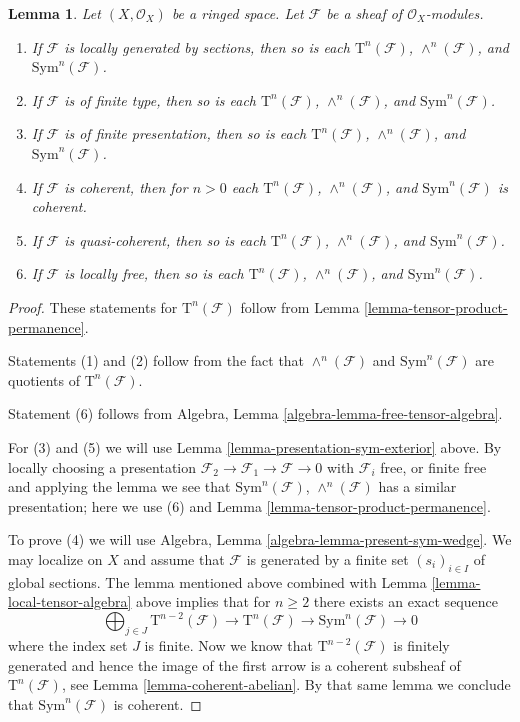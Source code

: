 \documentclass[10pt,a4paper]{amsart}
\theoremstyle{plain}
\newtheorem{lemma}[subsection]{Lemma}
\theoremstyle{definition}
\theoremstyle{remark}
\numberwithin{equation}{subsection}
\begin{document}
\begin{lemma}
\label{lemma-tensor-algebra-permanence}
Let $(X, \mathcal{O}_X)$ be a ringed space.
Let $\mathcal{F}$ be a sheaf of $\mathcal{O}_X$-modules.
\begin{enumerate}
\item If $\mathcal{F}$ is locally generated by sections,
then so is each $\text{T}^n(\mathcal{F})$,
$\wedge^n(\mathcal{F})$, and $\text{Sym}^n(\mathcal{F})$.
\item If $\mathcal{F}$ is of finite type,
then so is each $\text{T}^n(\mathcal{F})$,
$\wedge^n(\mathcal{F})$, and $\text{Sym}^n(\mathcal{F})$.
\item If $\mathcal{F}$ is of finite presentation,
then so is each $\text{T}^n(\mathcal{F})$,
$\wedge^n(\mathcal{F})$, and $\text{Sym}^n(\mathcal{F})$.
\item If $\mathcal{F}$ is coherent,
then for $n > 0$ each $\text{T}^n(\mathcal{F})$,
$\wedge^n(\mathcal{F})$, and $\text{Sym}^n(\mathcal{F})$
is coherent.
\item If $\mathcal{F}$ is quasi-coherent,
then so is each $\text{T}^n(\mathcal{F})$,
$\wedge^n(\mathcal{F})$, and $\text{Sym}^n(\mathcal{F})$.
\item If $\mathcal{F}$ is locally free,
then so is each $\text{T}^n(\mathcal{F})$,
$\wedge^n(\mathcal{F})$, and $\text{Sym}^n(\mathcal{F})$.
\end{enumerate}
\end{lemma}

\begin{proof}
These statements for $\text{T}^n(\mathcal{F})$ follow
from Lemma \ref{lemma-tensor-product-permanence}.

\medskip\noindent
Statements (1) and (2) follow from the fact that
$\wedge^n(\mathcal{F})$ and $\text{Sym}^n(\mathcal{F})$
are quotients of $\text{T}^n(\mathcal{F})$.

\medskip\noindent
Statement (6) follows from
Algebra, Lemma \ref{algebra-lemma-free-tensor-algebra}.

\medskip\noindent
For (3) and (5) we will use
Lemma \ref{lemma-presentation-sym-exterior} above.
By locally choosing a presentation
$\mathcal{F}_2 \to \mathcal{F}_1 \to \mathcal{F} \to 0$
with $\mathcal{F}_i$ free, or finite free and applying the
lemma we see that $\text{Sym}^n(\mathcal{F})$, $\wedge^n(\mathcal{F})$
has a similar presentation; here we use (6) and
Lemma \ref{lemma-tensor-product-permanence}.

\medskip\noindent
To prove (4) we will use
Algebra, Lemma \ref{algebra-lemma-present-sym-wedge}.
We may localize on $X$ and assume that
$\mathcal{F}$ is generated by a finite set
$(s_i)_{i \in I}$ of global sections.
The lemma mentioned above
combined with Lemma \ref{lemma-local-tensor-algebra} above
implies that for $n \geq 2$
there exists an exact sequence
$$
\bigoplus\nolimits_{j \in J}
\text{T}^{n - 2}(\mathcal{F})
\to
\text{T}^n(\mathcal{F})
\to
\text{Sym}^n(\mathcal{F})
\to
0
$$
where the index set $J$ is finite. Now we know that
$\text{T}^{n - 2}(\mathcal{F})$ is finitely generated
and hence the image of the first arrow is a coherent
subsheaf of $\text{T}^n(\mathcal{F})$, see Lemma \ref{lemma-coherent-abelian}.
By that same lemma we conclude that $\text{Sym}^n(\mathcal{F})$ is
coherent.
\end{proof}
\end{document}
